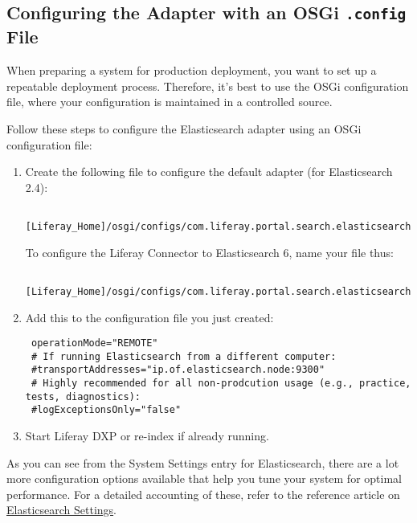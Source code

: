 \subsection{\texorpdfstring{Configuring the Adapter with an OSGi
\texttt{.config}
File}{Configuring the Adapter with an OSGi .config File}}\label{configuring-the-adapter-with-an-osgi-.config-file}

When preparing a system for production deployment, you want to set up a
repeatable deployment process. Therefore, it's best to use the OSGi
configuration file, where your configuration is maintained in a
controlled source.

Follow these steps to configure the Elasticsearch adapter using an OSGi
configuration file:

\begin{enumerate}
\def\labelenumi{\arabic{enumi}.}
\item
  Create the following file to configure the default adapter (for
  Elasticsearch 2.4):

\begin{verbatim}
 [Liferay_Home]/osgi/configs/com.liferay.portal.search.elasticsearch.configuration.ElasticsearchConfiguration.config
\end{verbatim}

  To configure the Liferay Connector to Elasticsearch 6, name your file
  thus:

\begin{verbatim}
 [Liferay_Home]/osgi/configs/com.liferay.portal.search.elasticsearch6.configuration.ElasticsearchConfiguration.config
\end{verbatim}
\item
  Add this to the configuration file you just created:

\begin{verbatim}
 operationMode="REMOTE"
 # If running Elasticsearch from a different computer:
 #transportAddresses="ip.of.elasticsearch.node:9300"
 # Highly recommended for all non-prodcution usage (e.g., practice, tests, diagnostics):
 #logExceptionsOnly="false"
\end{verbatim}
\item
  Start Liferay DXP or re-index if already running.
\end{enumerate}

As you can see from the System Settings entry for Elasticsearch, there
are a lot more configuration options available that help you tune your
system for optimal performance. For a detailed accounting of these,
refer to the reference article on
\href{/docs/7-0/deploy/-/knowledge_base/d/elasticsearch-settings}{Elasticsearch
Settings}.

